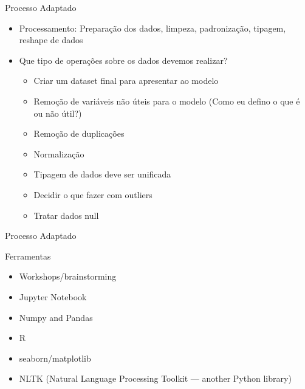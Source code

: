 \begin{frame}
	\begin{block}{Processo Adaptado}
		\begin{itemize}
		\item Processamento: Preparação dos dados, limpeza, padronização, tipagem, reshape de dados
		\item Que tipo de operações sobre os dados devemos realizar?
			\begin{itemize}
				\item Criar um dataset final para apresentar ao modelo
				\item Remoção de variáveis não úteis para o modelo (Como eu defino o que é ou não útil?)
				\item Remoção de duplicações
				\item Normalização
				\item Tipagem de dados deve ser unificada
				\item Decidir o que fazer com outliers
				\item Tratar dados null
			\end{itemize}
				
		\end{itemize}
	\end{block}
\end{frame}
    

\begin{frame}
	\begin{block}{Processo Adaptado}
	
		Ferramentas
		\begin{itemize}
			\item Workshops/brainstorming
			\item Jupyter Notebook
			\item Numpy and Pandas
			\item R
			\item seaborn/matplotlib
			\item NLTK (Natural Language Processing Toolkit — another Python library)
		\end{itemize}
	\end{block}
\end{frame}


